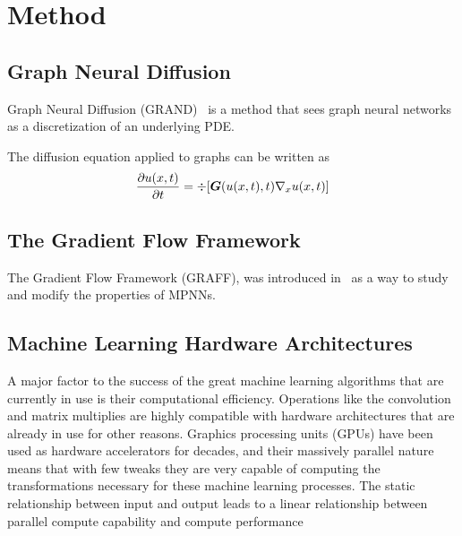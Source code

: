 \documentclass[../main.tex]{subfiles}
\begin{document}
    \chapter{Method}\label{ch:method}

    \section{Graph Neural Diffusion}\label{sec:graph-neural-diffusion}
    Graph Neural Diffusion (GRAND)~\cite{chamberlainGRANDGraphNeural2021} is a method that sees graph neural networks as a discretization of an underlying PDE\@.

    The diffusion equation applied to graphs can be written as
    \begin{equation}
        \frac{\partial u(x, t)}{\partial t} = \div [\bm G(u(x, t), t)\nabla_x u(x, t)]\label{eq:graph-diffusion}
    \end{equation}


    \section{The Gradient Flow Framework}\label{sec:the-gradient-flow-framework}
    The Gradient Flow Framework (GRAFF), was introduced in~\cite{digiovanniGraphNeuralNetworks2022} as a way to study and modify the properties of MPNNs.

    \section{Machine Learning Hardware Architectures}\label{sec:machine-learning-hardware-architectures}
    A major factor to the success of the great machine learning algorithms that are currently in use is their computational efficiency.
    Operations like the convolution and matrix multiplies are highly compatible with hardware architectures that are already in use for other reasons.
    Graphics processing units (GPUs) have been used as hardware accelerators for decades, and their massively parallel nature means that with few tweaks they are very capable of computing the transformations necessary for these machine learning processes.
    The static relationship between input and output leads to a linear relationship between parallel compute capability and compute performance
\end{document}
